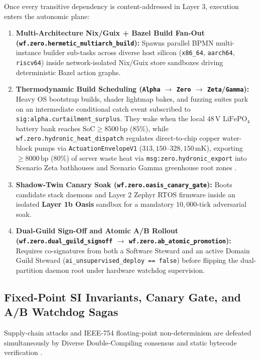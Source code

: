 Once every transitive dependency is content-addressed in Layer 3, execution enters the autonomic plane:
\begin{enumerate}
    \item \textbf{Multi-Architecture Nix/Guix + Bazel Build Fan-Out
    (\texttt{wf.zero.hermetic\_multiarch\_build}):} Spawns parallel BPMN multi-instance builder
    sub-tasks across diverse host silicon (\texttt{x86\_64}, \texttt{aarch64}, \texttt{riscv64})
    inside network-isolated Nix/Guix store sandboxes driving deterministic Bazel action graphs.
    \item \textbf{Thermodynamic Build Scheduling (\texttt{Alpha} $\to$ \texttt{Zero} $\to$
    \texttt{Zeta}/\texttt{Gamma}):} Heavy OS bootstrap builds, shader lightmap bakes, and fuzzing
    suites park on an intermediate conditional catch event subscribed to
    \texttt{sig:alpha.curtailment\_surplus}. They wake when the local $48\,\mathrm{V}$
    $\mathrm{LiFePO_4}$ battery bank reaches $\mathrm{SoC} \ge 8500\,\mathrm{bp}$ ($85\%$), while
    \texttt{wf.zero.hydronic\_heat\_dispatch} regulates direct-to-chip copper water-block pumps via
    \texttt{ActuationEnvelopeV1} ($313{,}150\text{--}328{,}150\,\mathrm{mK}$), exporting
    $\ge 8000\,\mathrm{bp}$ ($80\%$) of server waste heat via \texttt{msg:zero.hydronic\_export}
    into Scenario Zeta bathhouses and Scenario Gamma greenhouse root zones \parencite{georgescu1971}.
    \item \textbf{Shadow-Twin Canary Soak (\texttt{wf.zero.oasis\_canary\_gate}):} Boots candidate
    stack daemons and Layer 2 Zephyr RTOS firmware inside an isolated \textbf{Layer 1b Oasis}
    sandbox for a mandatory $10{,}000\text{-tick}$ adversarial soak.
    \item \textbf{Dual-Guild Sign-Off and Atomic A/B Rollout
    (\texttt{wf.zero.dual\_guild\_signoff} $\to$ \texttt{wf.zero.ab\_atomic\_promotion}):} Requires
    co-signatures from both a Software Steward and an active Domain Guild Steward
    (\texttt{ai\_unsupervised\_deploy == false}) before flipping the dual-partition daemon root
    under hardware watchdog supervision.
\end{enumerate}

\subsection{Fixed-Point SI Invariants, Canary Gate, and A/B Watchdog Sagas}

Supply-chain attacks and IEEE-754 floating-point non-determinism are defeated simultaneously by Diverse
Double-Compiling consensus and static bytecode verification \parencite{haas2017wasm,rose2020zero}.

